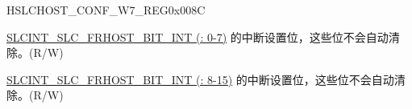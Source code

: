 \begin{register}{H}{SLCHOST\_CONF\_W7\_REG}{0x008C}\label{regdesc:SLCHOSTCONFW7REG}
%
%
%
%
\regnewline%
\begin{regdesc}\begin{reglist}
\label{fielddesc:SLCHOSTSLCHOSTCONF29}\item [SLCHOST\_SLCHOST\_CONF29] \hyperref[int:SLCFRHOSTBITnINT]{SLCINT\_SLC\_FRHOST\_BIT\_INT (: 0-7)} 的中断设置位，这些位不会自动清除。(R/W)
\label{fielddesc:SLCHOSTSLCHOSTCONF31}\item [SLCHOST\_SLCHOST\_CONF31] \hyperref[int:SLCFRHOSTBITnINT]{SLCINT\_SLC\_FRHOST\_BIT\_INT (: 8-15)} 的中断设置位，这些位不会自动清除。(R/W)
\end{reglist}\end{regdesc}
\end{register}


